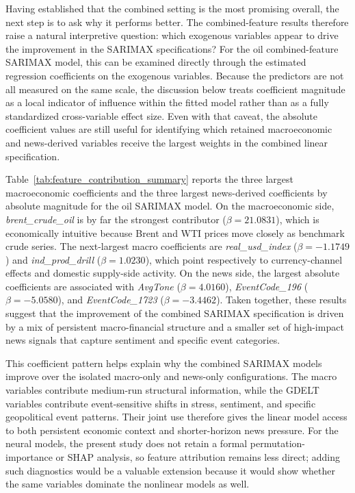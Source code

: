 \documentclass[pdflatex,sn-mathphys-num]{sn-jnl}%
\theoremstyle{thmstyleone}%
\theoremstyle{thmstyletwo}%
\theoremstyle{thmstylethree}%
\begin{document}
Having established that the combined setting is the most promising overall, the next step is to ask why it performs better. The combined-feature results therefore raise a natural interpretive question: which exogenous variables appear to drive the improvement in the SARIMAX specifications? For the oil combined-feature SARIMAX model, this can be examined directly through the estimated regression coefficients on the exogenous variables. Because the predictors are not all measured on the same scale, the discussion below treats coefficient magnitude as a local indicator of influence within the fitted model rather than as a fully standardized cross-variable effect size. Even with that caveat, the absolute coefficient values are still useful for identifying which retained macroeconomic and news-derived variables receive the largest weights in the combined linear specification.

Table~\ref{tab:feature_contribution_summary} reports the three largest macroeconomic coefficients and the three largest news-derived coefficients by absolute magnitude for the oil SARIMAX model. On the macroeconomic side, \textit{brent\_crude\_oil} is by far the strongest contributor ($\beta=21.0831$), which is economically intuitive because Brent and WTI prices move closely as benchmark crude series. The next-largest macro coefficients are \textit{real\_usd\_index} ($\beta=-1.1749$) and \textit{ind\_prod\_drill} ($\beta=1.0230$), which point respectively to currency-channel effects and domestic supply-side activity. On the news side, the largest absolute coefficients are associated with \textit{AvgTone} ($\beta=4.0160$), \textit{EventCode\_196} ($\beta=-5.0580$), and \textit{EventCode\_1723} ($\beta=-3.4462$). Taken together, these results suggest that the improvement of the combined SARIMAX specification is driven by a mix of persistent macro-financial structure and a smaller set of high-impact news signals that capture sentiment and specific event categories.

This coefficient pattern helps explain why the combined SARIMAX models improve over the isolated macro-only and news-only configurations. The macro variables contribute medium-run structural information, while the GDELT variables contribute event-sensitive shifts in stress, sentiment, and specific geopolitical event patterns. Their joint use therefore gives the linear model access to both persistent economic context and shorter-horizon news pressure. For the neural models, the present study does not retain a formal permutation-importance or SHAP analysis, so feature attribution remains less direct; adding such diagnostics would be a valuable extension because it would show whether the same variables dominate the nonlinear models as well.
\end{document}
